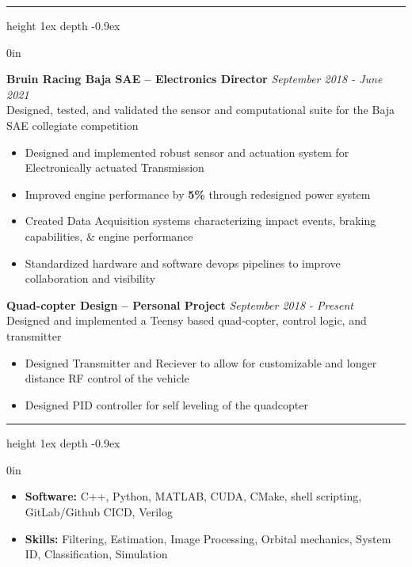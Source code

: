 \documentclass[11pt, letterpaper]{article}
\newcommand\smallspace{4pt}
\newcommand\indentlength{0.25in}
\def\Vhrulefill{\leavevmode\leaders\hrule height 1ex depth \dimexpr0.1pt-0.9ex\hfill\kern0pt}
\newenvironment{category}[1]
{
	\vspace{\smallspace}
	\noindent {\LARGE{\sc{#1}}} \hspace{2pt}
	\Vhrulefill
	\vspace{\smallspace}
	\begin{addmargin}[\indentlength]{0in}
	}
	{
	\end{addmargin}
	\vspace{\smallspace}
}
\newenvironment{experience}[4][3]{
	\vspace{\smallspace}
	\noindent\textbf{#2}
	\hfill \textit{#3} \\
	#4
	\vspace{\smallspace}
	\begin{itemize}
	}
	{
	\end{itemize}
	\vspace{\smallspace}
}
\begin{document}
	\begin{category}{Project Experience}
		\begin{experience}{Bruin Racing Baja SAE -- Electronics Director}{September 2018 - June 2021}{Designed, tested, and validated the sensor and computational suite for the Baja SAE collegiate competition}
			\item Designed and implemented robust sensor and actuation system for Electronically actuated Transmission
			\item Improved engine performance by \textbf{5\%} through redesigned power system 
			\item Created Data Acquisition systems characterizing impact events, braking capabilities, \& engine performance
			\item Standardized hardware and software devops pipelines to improve collaboration and visibility
			 
		\end{experience}
		\begin{experience}{Quad-copter Design -- Personal Project}{September 2018 - Present}{Designed and implemented a Teensy based quad-copter, control logic, and transmitter}
			\item Designed Transmitter and Reciever to allow for customizable and longer distance RF control of the vehicle
			\item Designed PID controller for self leveling of the quadcopter
		\end{experience}
	
	\end{category}
	
	\begin{category}{Skills}
		\begin{itemize}[noitemsep,nolistsep]
			\item \textbf{Software:} C++, Python, MATLAB, CUDA, CMake, shell scripting, GitLab/Github CICD, Verilog
			\item \textbf{Skills:} Filtering, Estimation, Image Processing, Orbital mechanics, System ID, Classification, Simulation
		\end{itemize}
	\end{category}
\end{document}
